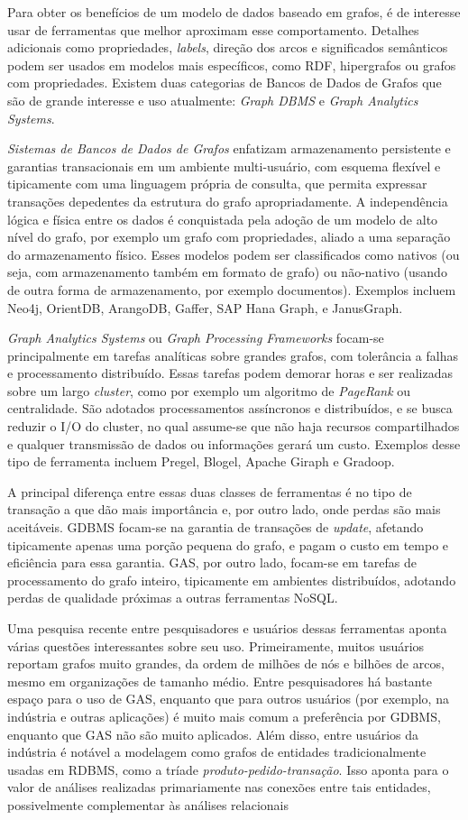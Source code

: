 
Para obter os benefícios de um modelo de dados baseado em grafos, é de interesse usar de ferramentas que melhor aproximam esse comportamento. Detalhes adicionais como propriedades, \emph{labels}, direção dos arcos e significados semânticos podem ser usados em modelos mais específicos, como RDF, hipergrafos ou grafos com propriedades. Existem duas categorias de Bancos de Dados de Grafos que são de grande interesse e uso atualmente: \emph{Graph DBMS} e \emph{Graph Analytics Systems}.

\emph{Sistemas de Bancos de Dados de Grafos} enfatizam armazenamento persistente e garantias transacionais em um ambiente multi-usuário, com esquema flexível e tipicamente com uma linguagem própria de consulta, que permita expressar transações depedentes da estrutura do grafo apropriadamente. A independência lógica e física entre os dados é conquistada pela adoção de um modelo de alto nível do grafo, por exemplo um grafo com propriedades, aliado a uma separação do armazenamento físico. Esses modelos podem ser classificados como nativos (ou seja, com armazenamento também em formato de grafo) ou não-nativo (usando de outra forma de armazenamento, por exemplo documentos). Exemplos incluem Neo4j, OrientDB, ArangoDB, Gaffer, SAP Hana Graph, e JanusGraph.

\emph{Graph Analytics Systems} ou \emph{Graph Processing Frameworks} focam-se principalmente em tarefas analíticas sobre grandes grafos, com tolerância a falhas e processamento distribuído. Essas tarefas podem demorar horas e ser realizadas sobre um largo \emph{cluster}, como por exemplo um algoritmo de \emph{PageRank} ou centralidade. São adotados processamentos assíncronos e distribuídos, e se busca reduzir o I/O do cluster, no qual assume-se que não haja recursos compartilhados e qualquer transmissão de dados ou informações gerará um custo. Exemplos desse tipo de ferramenta incluem Pregel, Blogel, Apache Giraph e Gradoop.

A principal diferença entre essas duas classes de ferramentas é no tipo de transação a que dão mais importância e, por outro lado, onde perdas são mais aceitáveis. GDBMS focam-se na garantia de transações de \emph{update}, afetando tipicamente apenas uma porção pequena do grafo, e pagam o custo em tempo e eficiência para essa garantia. GAS, por outro lado, focam-se em tarefas de processamento do grafo inteiro, tipicamente em ambientes distribuídos, adotando perdas de qualidade próximas a outras ferramentas NoSQL.

Uma pesquisa recente entre pesquisadores e usuários dessas ferramentas \cite{sahu} aponta várias questões interessantes sobre seu uso. Primeiramente, muitos usuários reportam grafos muito grandes, da ordem de milhões de nós e bilhões de arcos, mesmo em organizações de tamanho médio. Entre pesquisadores há bastante espaço para o uso de GAS, enquanto que para outros usuários (por exemplo, na indústria e outras aplicações) é muito mais comum a preferência por GDBMS, enquanto que GAS não são muito aplicados. Além disso, entre usuários da indústria é notável a modelagem como grafos de entidades tradicionalmente usadas em RDBMS, como a tríade \emph{produto-pedido-transação}. Isso aponta para o valor de análises realizadas primariamente nas conexões entre tais entidades, possivelmente complementar às análises relacionais
